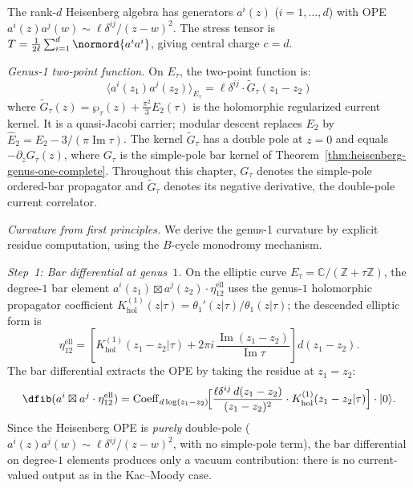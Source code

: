 \begin{computation}
\label{comp:rank-d-heisenberg-genus1}

The rank-$d$ Heisenberg algebra has generators
$a^i(z)$ ($i = 1, \ldots, d$) with OPE
$a^i(z) a^j(w) \sim \ell \delta^{ij}/(z-w)^2$.
The stress tensor is $T = \frac{1}{2\ell} \sum_{i=1}^d
\normord{a^i a^i}$, giving central charge $c = d$.

\emph{Genus-1 two-point function.}
On $E_\tau$, the two-point function is:
\[
\langle a^i(z_1) a^j(z_2) \rangle_{E_\tau}
= \ell \delta^{ij} \cdot \widetilde{G}_\tau(z_1 - z_2)
\]
where $\widetilde{G}_\tau(z) = \wp_\tau(z) + \frac{\pi^2}{3} E_2(\tau)$
is the holomorphic regularized current kernel. It is a quasi-Jacobi
carrier; modular descent replaces $E_2$ by
$\widehat E_2=E_2-3/(\pi\operatorname{Im}\tau)$. The kernel
$\widetilde{G}_\tau$ has a double pole at $z=0$ and equals
$-\partial_z G_\tau(z)$, where $G_\tau$ is the simple-pole bar kernel
of Theorem~\ref{thm:heisenberg-genus-one-complete}. Throughout this
chapter, $G_\tau$ denotes the simple-pole ordered-bar propagator and
$\widetilde{G}_\tau$ denotes its negative derivative, the
double-pole current correlator.

\emph{Curvature from first principles.}
We derive the genus-1 curvature by explicit residue computation,
using the $B$-cycle monodromy mechanism.

\emph{Step~1: Bar differential at genus~$1$.}
On the elliptic curve $E_\tau = \mathbb{C}/(\mathbb{Z}+\tau\mathbb{Z})$,
the degree-$1$ bar element
$a^i(z_1) \boxtimes a^j(z_2) \cdot \eta_{12}^{\mathrm{ell}}$
uses the genus-$1$ holomorphic propagator coefficient
$K_{\mathrm{hol}}^{(1)}(z|\tau) = \theta_1'(z|\tau)/\theta_1(z|\tau)$;
the descended elliptic form is
\[
\eta_{12}^{\mathrm{ell}}
=
\left[
K_{\mathrm{hol}}^{(1)}(z_1-z_2|\tau)
+2\pi i\,\frac{\operatorname{Im}(z_1-z_2)}{\operatorname{Im}\tau}
\right]d(z_1-z_2).
\]
The bar differential extracts the OPE by taking the residue
at $z_1 = z_2$:
\begin{equation}\label{eq:heisenberg-bar-diff-genus1}
\dfib(a^i \boxtimes a^j \cdot \eta_{12}^{\mathrm{ell}})
= \operatorname{Coeff}_{d\log(z_1-z_2)}
\!\Bigl[\frac{\ell\delta^{ij}\,d(z_1-z_2)}{(z_1-z_2)^2}
\cdot K_{\mathrm{hol}}^{(1)}(z_1 - z_2|\tau)\Bigr]
\cdot |0\rangle.
\end{equation}
Since the Heisenberg OPE is \emph{purely} double-pole
($a^i(z)a^j(w) \sim \ell\delta^{ij}/(z-w)^2$, with no
simple-pole term), the bar differential on degree-$1$ elements
produces only a vacuum contribution: there is no
current-valued output as in the Kac--Moody case.


\end{computation}
